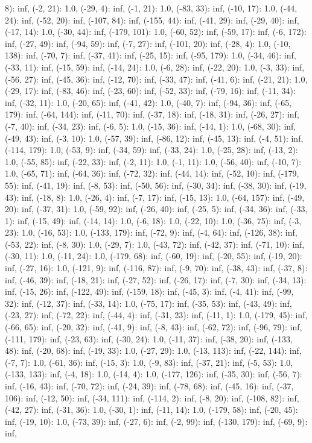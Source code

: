 \documentclass[parskip=half]{scrartcl}
\begin{document}
8): inf, (-2, 21): 1.0, (-29, 4): inf, (-1, 21): 1.0, (-83, 33): inf, (-10, 17): 1.0, (-44, 24): inf, (-52, 20): inf, (-107, 84): inf, (-155, 44): inf, (-41, 29): inf, (-29, 40): inf, (-17, 14): 1.0, (-30, 44): inf, (-179, 101): 1.0, (-60, 52): inf, (-59, 17): inf, (-6, 172): inf, (-27, 49): inf, (-94, 59): inf, (-7, 27): inf, (-101, 20): inf, (-28, 4): 1.0, (-10, 138): inf, (-70, 7): inf, (-37, 41): inf, (-25, 15): inf, (-95, 179): 1.0, (-34, 46): inf, (-33, 11): inf, (-15, 59): inf, (-14, 24): 1.0, (-6, 28): inf, (-22, 20): 1.0, (-3, 33): inf, (-56, 27): inf, (-45, 36): inf, (-12, 70): inf, (-33, 47): inf, (-41, 6): inf, (-21, 21): 1.0, (-29, 17): inf, (-83, 46): inf, (-23, 60): inf, (-52, 33): inf, (-79, 16): inf, (-11, 34): inf, (-32, 11): 1.0, (-20, 65): inf, (-41, 42): 1.0, (-40, 7): inf, (-94, 36): inf, (-65, 179): inf, (-64, 144): inf, (-11, 70): inf, (-37, 18): inf, (-18, 31): inf, (-26, 27): inf, (-7, 40): inf, (-34, 23): inf, (-6, 5): 1.0, (-15, 36): inf, (-14, 1): 1.0, (-68, 30): inf, (-49, 43): inf, (-3, 10): 1.0, (-57, 39): inf, (-86, 12): inf, (-45, 13): inf, (-4, 51): inf, (-114, 179): 1.0, (-53, 9): inf, (-34, 59): inf, (-33, 24): 1.0, (-25, 28): inf, (-13, 2): 1.0, (-55, 85): inf, (-22, 33): inf, (-2, 11): 1.0, (-1, 11): 1.0, (-56, 40): inf, (-10, 7): 1.0, (-65, 71): inf, (-64, 36): inf, (-72, 32): inf, (-44, 14): inf, (-52, 10): inf, (-179, 55): inf, (-41, 19): inf, (-8, 53): inf, (-50, 56): inf, (-30, 34): inf, (-38, 30): inf, (-19, 43): inf, (-18, 8): 1.0, (-26, 4): inf, (-7, 17): inf, (-15, 13): 1.0, (-64, 157): inf, (-49, 20): inf, (-37, 31): 1.0, (-59, 92): inf, (-26, 40): inf, (-25, 5): inf, (-34, 36): inf, (-33, 1): inf, (-15, 49): inf, (-14, 14): 1.0, (-6, 18): 1.0, (-22, 10): 1.0, (-36, 75): inf, (-3, 23): 1.0, (-16, 53): 1.0, (-133, 179): inf, (-72, 9): inf, (-4, 64): inf, (-126, 38): inf, (-53, 22): inf, (-8, 30): 1.0, (-29, 7): 1.0, (-43, 72): inf, (-42, 37): inf, (-71, 10): inf, (-30, 11): 1.0, (-11, 24): 1.0, (-179, 68): inf, (-60, 19): inf, (-20, 55): inf, (-19, 20): inf, (-27, 16): 1.0, (-121, 9): inf, (-116, 87): inf, (-9, 70): inf, (-38, 43): inf, (-37, 8): inf, (-46, 39): inf, (-18, 21): inf, (-27, 52): inf, (-26, 17): inf, (-7, 30): inf, (-34, 13): inf, (-15, 26): inf, (-122, 49): inf, (-159, 18): inf, (-45, 3): inf, (-4, 41): inf, (-99, 32): inf, (-12, 37): inf, (-33, 14): 1.0, (-75, 17): inf, (-35, 53): inf, (-43, 49): inf, (-23, 27): inf, (-72, 22): inf, (-44, 4): inf, (-31, 23): inf, (-11, 1): 1.0, (-179, 45): inf, (-66, 65): inf, (-20, 32): inf, (-41, 9): inf, (-8, 43): inf, (-62, 72): inf, (-96, 79): inf, (-111, 179): inf, (-23, 63): inf, (-30, 24): 1.0, (-11, 37): inf, (-38, 20): inf, (-133, 48): inf, (-20, 68): inf, (-19, 33): 1.0, (-27, 29): 1.0, (-13, 113): inf, (-22, 144): inf, (-7, 7): 1.0, (-61, 36): inf, (-15, 3): 1.0, (-9, 83): inf, (-37, 21): inf, (-5, 53): 1.0, (-133, 133): inf, (-4, 18): 1.0, (-14, 4): 1.0, (-177, 126): inf, (-35, 30): inf, (-56, 7): inf, (-16, 43): inf, (-70, 72): inf, (-24, 39): inf, (-78, 68): inf, (-45, 16): inf, (-37, 106): inf, (-12, 50): inf, (-34, 111): inf, (-114, 2): inf, (-8, 20): inf, (-108, 82): inf, (-42, 27): inf, (-31, 36): 1.0, (-30, 1): inf, (-11, 14): 1.0, (-179, 58): inf, (-20, 45): inf, (-19, 10): 1.0, (-73, 39): inf, (-27, 6): inf, (-2, 99): inf, (-130, 179): inf, (-69, 9): inf, 
\end{document}
